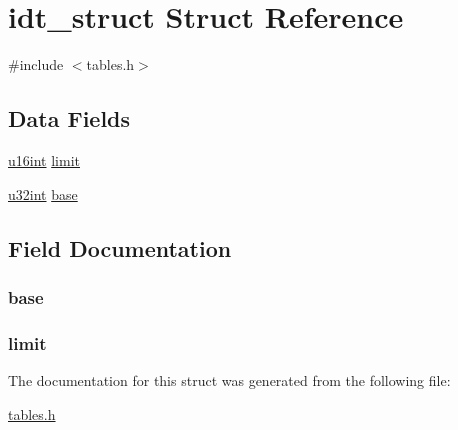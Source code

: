 \hypertarget{structidt__struct}{}\section{idt\+\_\+struct Struct Reference}
\label{structidt__struct}


{\ttfamily \#include $<$tables.\+h$>$}

\subsection*{Data Fields}
\begin{DoxyCompactItemize}
\item 
\hyperlink{system_8h_a863d9497073aad2b991aeab2211d87af}{u16int} \hyperlink{structidt__struct_a68fd3b4f6c14a331ca9b226cbf122e13}{limit}
\item 
\hyperlink{system_8h_a757de76cafbcddaac0d1632902fe4cb8}{u32int} \hyperlink{structidt__struct_ab5763c2b18c825c8b8fba44b2e60ddc1}{base}
\end{DoxyCompactItemize}


\subsection{Field Documentation}
\hypertarget{structidt__struct_ab5763c2b18c825c8b8fba44b2e60ddc1}{}
\subsubsection[{base}]{ base}\label{structidt__struct_ab5763c2b18c825c8b8fba44b2e60ddc1}
\hypertarget{structidt__struct_a68fd3b4f6c14a331ca9b226cbf122e13}{}
\subsubsection[{limit}]{ limit}\label{structidt__struct_a68fd3b4f6c14a331ca9b226cbf122e13}


The documentation for this struct was generated from the following file\+:\begin{DoxyCompactItemize}
\item 
\hyperlink{tables_8h}{tables.\+h}\end{DoxyCompactItemize}
